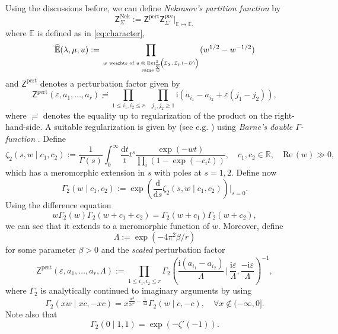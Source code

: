 \documentclass[11pt,colorinlistoftodos]{amsart}
\numberwithin{equation}{subsection}
\theoremstyle{plain}
\theoremstyle{definition}
\theoremstyle{remark}
\newcommand{\R}{\mathbb{R}}
\newcommand{\E}{\mathbb{E}}
\newcommand{\dd}{{\mathrm{d}}}
\newcommand{\calI}{\mathcal{I}}
\let\Hat=\widehat
\newcommand{\I}{\mathrm{i}}
\begin{document}
Using the discussions before, we can define \emph{Nekrasov's partition function} by
\begin{equation}
    \label{eq:Nekrasov_partition_function}
    \mathsf{Z}^{\mathrm{Nek}}_\Sigma:=\mathsf{Z}^\mathrm{pert}\mathsf{Z}^{\mathrm{pre}}_\Sigma\Big|_{\E\mapsto \Hat{\E},}
\end{equation}
where $\E$ is defined as in \eqref{eq:character}, 
\[
\Hat{\E}(\lambda,\mu,u):=\prod_{\text{$w$ weights of $u\otimes \mathrm{Ext}^1_{\overline{\Sigma}}\big(\calI_\lambda,\calI_\mu(-D)\big)$}\atop\text{same $w$}}(w^{1/2}-w^{-1/2}) 
\]
and $\mathsf{Z}^\mathrm{pert}$ denotes a perturbation factor given by 
\begin{equation}
\label{eq:Nekrasov_perturbative}
\mathsf{Z}^\mathrm{pert}(\varepsilon,a_1,\ldots,a_r)\risingdotseq \prod_{1\leq i_1,i_2\leq r}\,\,\, \prod_{j_1,j_2\geq 1}\I(a_{i_1}-a_{i_2}+\varepsilon(j_1-j_2)), 
\end{equation}
where $\risingdotseq$ denotes the equality up to regularization of the product on the right-hand-side.
A suitable regularization is given by (see e.g. \cite{NekrasovOkounkov2006,Okounkov2006}) using \emph{Barne's double $\Gamma$-function} \cite{Ruijsenaars2000}. Define
\begin{equation}
    \zeta_2(s,w\mid c_1,c_2):=\frac{1}{\Gamma(s)}\int_0^\infty\frac{\dd t}{t}t^s\frac{\exp(-wt)}{\prod_i(1-\exp(-c_it))},\quad c_1,c_2\in\R,\quad \mathrm{Re}\,(w)\gg0,
\end{equation}
which has a meromorphic extension in $s$ with poles at $s=1,2$. Define now 
\[
\Gamma_2(w\mid c_1,c_2):=\exp\left(\frac{\dd}{\dd s}\zeta_2(s,w\mid c_1,c_2)\right)\Bigg|_{s=0}.
\]
Using the difference equation 
\[
w\Gamma_2(w)\Gamma_2(w+c_1+c_2)=\Gamma_2(w+c_1)\Gamma_2(w+c_2),
\]
we can see that it extends to a meromorphic function of $w$. Moreover, define
\begin{equation}
    \label{eq:Lambda}
    \Lambda:=\exp(-4\pi^2\beta/r)
\end{equation}
for some parameter $\beta>0$ and the \emph{scaled} perturbation factor 
\begin{equation}
    \mathsf{Z}^\mathrm{pert}(\varepsilon,a_1,\ldots,a_r,\Lambda):=\prod_{1\leq i_1,i_2\leq r}\Gamma_2\left(\frac{\I(a_{i_1}-a_{i_2})}{\Lambda}\,\Bigg|\,\frac{\I\varepsilon}{\Lambda},\frac{-\I\varepsilon}{\Lambda}\right)^{-1},
\end{equation}
where $\Gamma_2$ is analytically continued to imaginary arguments by using
\[
\Gamma_2(xw\mid xc,-xc)=x^{\frac{w^2}{2c^2}-\frac{1}{12}}\Gamma_2(w\mid c,-c),\quad \forall x\not\in (-\infty,0].
\]
Note also that 
\[
\Gamma_2(0\mid 1,1)=\exp(-\zeta'(-1)).
\]
\end{document}
